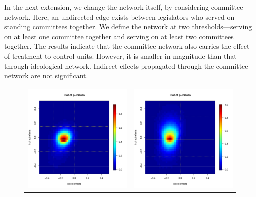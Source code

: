 \documentclass[12pt]{article}
\begin{document}
In the next extension, we change the network itself, by considering committee network. Here, an undirected edge exists between legislators who served on standing committees together.  We define the network at two thresholds---serving on at least one committee together and serving on at least two committees together.  The results indicate that the committee network also carries the effect of treatment to control units. However, it is smaller in magnitude than that through ideological network. Indirect effects propagated through the committee network are not significant.

\begin{figure}
	\centering
	\begin{tabular}{cc}
	\includegraphics[scale=0.45]{./images/pval_plot_coppock_committee_1ormore_raw.pdf} &
	\includegraphics[scale=0.45]{./images/pval_plot_coppock_committee_2ormore_raw.pdf}

\end{tabular}
\end{figure}
\end{document}
